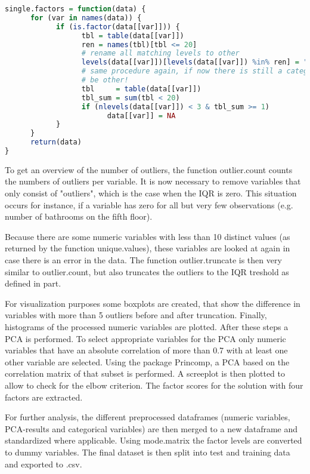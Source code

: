 \begin{lstlisting}[language=R]
single.factors = function(data) {
      for (var in names(data)) {
            if (is.factor(data[[var]])) {
                  tbl = table(data[[var]])
                  ren = names(tbl)[tbl <= 20]
                  # rename all matching levels to other
                  levels(data[[var]])[levels(data[[var]]) %in% ren] = "Other"
                  # same procedure again, if now there is still a category with less than 20 it can only
                  # be other!
                  tbl     = table(data[[var]])
                  tbl_sum = sum(tbl < 20)
                  if (nlevels(data[[var]]) < 3 & tbl_sum >= 1) 
                        data[[var]] = NA
            }
      }
      return(data)
}
\end{lstlisting}


To get an overview of the number of outliers, the function outlier.count  counts the numbers of outliers per variable.
It is now necessary to remove variables that only consist of "outliers", which is the case when the IQR is zero. This situation occurs for instance, if a variable has zero for all but very few observations (e.g. number of bathrooms on the fifth floor). 

Because there are some numeric variables with less than 10 distinct values (as returned by the function unique.values), these variables are looked at again in case there is an error in the data. 
The function outlier.truncate is then very similar to outlier.count, but also truncates the outliers to the IQR treshold as defined in part. 

For visualization purposes some boxplots are created, that show the difference in variables with more than 5 outliers before and after truncation. 
Finally, histograms of the processed numeric variables are plotted. 
After these steps a PCA is performed. 
To select appropriate variables for the PCA only numeric variables that have an absolute correlation of more than 0.7 with at least one other variable are selected.  Using the package Princomp, a PCA based on the correlation matrix of that subset is performed. 
A screeplot is then plotted to allow to check for the elbow criterion. The factor scores for the solution with four factors are extracted. 

For further analysis, the different preprocessed dataframes (numeric variables, PCA-results and categorical variables) are then merged to a new dataframe and standardized where applicable. Using mode.matrix the factor levels are converted to dummy variables. The final dataset is then split into test and training data and exported to .csv.
